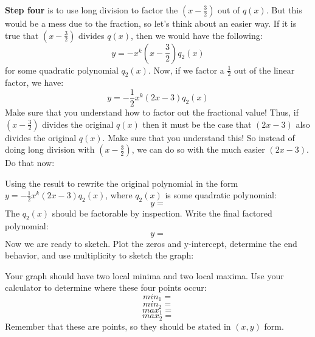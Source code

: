 \documentclass[letterpaper,12pt,fleqn]{article}
\begin{document}
\textbf{Step four} is to use long division to factor the $\left(x-\frac{3}{2}\right)$ out
of $q(x)$. But this would be a mess due to the fraction, so let's think about an easier
way. If it is true that $\left(x-\frac{3}{2}\right)$ divides $q(x)$, then we would have
the following:
\[y=-x^k\left(x-\frac{3}{2}\right)q_2(x)\]
for some quadratic polynomial $q_2(x)$. Now, if we factor a $\frac{1}{2}$ out of the
linear factor, we have:
\[y=-\frac{1}{2}x^k(2x-3)q_2(x)\]
Make sure that you understand how to factor out the fractional value! Thus, if
$\left(x-\frac{3}{2}\right)$ divides the original $q(x)$ then it must be the case that
$(2x-3)$ also divides the original $q(x)$. Make sure that you understand this! So
instead of doing long division with $\left(x-\frac{3}{2}\right)$, we can do so with the
much easier $(2x-3)$. Do that now:

\newpage

Using the result to rewrite the original polynomial in the form
$y=-\frac{1}{2}x^k(2x-3)q_2(x)$, where $q_2(x)$ is some quadratic polynomial:
\[y=\]
The $q_2(x)$ should be factorable by inspection. Write the final factored polynomial:
\[y=\]
Now we are ready to sketch. Plot the zeros and y-intercept, determine the end behavior,
and use multiplicity to sketch the graph:

\newpage

Your graph should have two local minima and two local maxima. Use your calculator to
determine where these four points occur:
\[min_1=\]
\[min_2=\]
\[max_1=\]
\[max_2=\]
Remember that these are points, so they should be stated in $(x,y)$ form.
\end{document}
